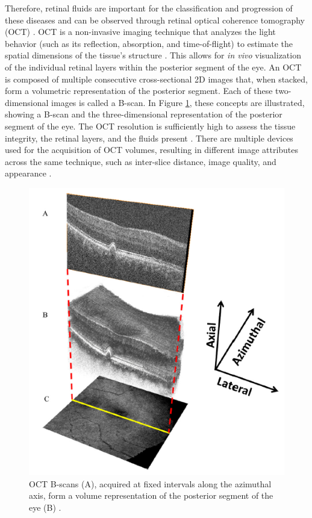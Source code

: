 Therefore, retinal fluids are important for the classification and progression of these diseases and can be observed through retinal optical coherence tomography (OCT) \parencite{Bogunovic2019a}. OCT is a non-invasive imaging technique that analyzes the light behavior (such as its reflection, absorption, and time-of-flight) to estimate the spatial dimensions of the tissue's structure \parencite{Huang1991}. This allows for \textit{in vivo} visualization of the individual retinal layers within the posterior segment of the eye. An OCT is composed of multiple consecutive cross-sectional 2D images that, when stacked, form a volumetric representation of the posterior segment. Each of these two-dimensional images is called a B-scan. In Figure \ref{fig:OCTVolume}, these concepts are illustrated, showing a B-scan and the three-dimensional representation of the posterior segment of the eye. The OCT resolution is sufficiently high to assess the tissue integrity, the retinal layers, and the fluids present \parencite{Drexler2008, Viedma2022}. There are multiple devices used for the acquisition of OCT volumes, resulting in different image attributes across the same technique, such as inter-slice distance, image quality, and appearance \parencite{Bogunovic2019a}. 

\begin{figure}[!ht]
	\centering
	\includegraphics[width=0.5\linewidth]{figures/OCTVolume.png}
	\caption{OCT B-scans (A), acquired at fixed intervals along the azimuthal axis, form a volume representation of the posterior segment of the eye (B) \parencite{Jain2010}.}
	\label{fig:OCTVolume}
\end{figure}

